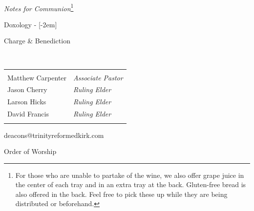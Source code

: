 
\usepackage{framed}
\usepackage{enumitem}

    \pagestyle{empty}
    \raggedright
    \setlength{\parindent}{0pt}
    \setlength{\parskip}{1em}
    \setlength{\marginparwidth}{2em}

	
  \vspace{.3in}

   \\
	\hspace{3mm}\textit{Notes for Communion}\footnote{For those who are unable to partake of the wine, we also offer grape juice in the center of each tray and in an extra tray at the back. Gluten-free bread is also offered in the back. Feel free to pick these up while they are being distributed or beforehand.}

	\hymnsix

	\hymnseven

  Doxology - \hymneight {}[-2em]

	\vspace{1.5\baselineskip}


	Charge \& Benediction

	\benediction

  \vfill{

  \begin{center}
	 \\
  \begin{tabular}{ll}
    & \\
  Matthew Carpenter & \textit{Associate Pastor} \\
  Jason Cherry & \textit{Ruling Elder}\\
  Larson Hicks & \textit{Ruling Elder}\\
  David Francis & \textit{Ruling Elder}\\
    &  \\
  \end{tabular}
  deacons@trinityreformedkirk.com
  \end{center}
}


  \newpage

	\begin{center}
		\LARGE
		\null \vspace{.5in}
		Order of Worship

		\Large \coverdate
	\end{center}

